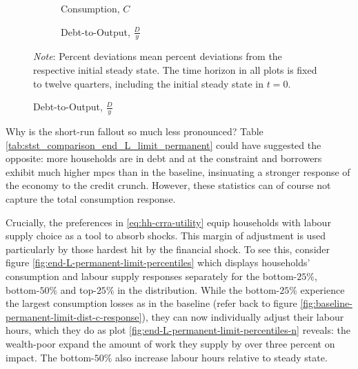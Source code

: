 \documentclass[a4paper,12pt]{article} %
\numberwithin{equation}{section} %
\numberwithin{figure}{section}
\numberwithin{table}{section}
\begin{document}
\begin{figure}[t]
    \centering
    \caption{Endogenous Labour Supply -- Shock to the Borrowing Limit: Aggregate Dynamics}
    \label{fig:comparison-end-labour-agg}
    \begin{subfigure}[b]{0.49\textwidth}
    \caption{Consumption, $C$}
    \label{fig:comparison-end-labour-c}
         \centering
         
     \end{subfigure}
     \hfill
    \begin{subfigure}[b]{0.49\textwidth}
    \caption{Debt-to-Output, $\frac{D}{y}$}
    \label{fig:comparison-end-labour-DY}
         \centering
         
     \end{subfigure}
     
     \vspace{10pt}
     
     \justifying
     \footnotesize
	\textit{Note}: Percent deviations mean percent deviations from the respective initial steady state. The time horizon in all plots is fixed to twelve quarters, including the initial steady state in $t=0$.
\end{figure}

Why is the short-run fallout so much less pronounced? Table \ref{tab:stst_comparison_end_L_limit_permanent} could have suggested the opposite: more households are in debt and at the constraint and borrowers exhibit much higher \Gls{mpc}s than in the baseline, insinuating a stronger response of the economy to the credit crunch. However, these statistics can of course not capture the total consumption response. 

Crucially, the preferences in \eqref{eq:hh-crra-utility} equip households with labour supply choice as a tool to absorb shocks. This margin of adjustment is used particularly by those hardest hit by the financial shock. To see this, consider figure \ref{fig:end-L-permanent-limit-percentiles} which displays households' consumption and labour supply responses separately for the bottom-$25\%$, bottom-$50\%$ and top-$25\%$ in the distribution. While the bottom-$25\%$ experience the largest consumption losses as in the baseline (refer back to figure \ref{fig:baseline-permanent-limit-dist-c-response}), they can now individually adjust their labour hours, which they do as plot \ref{fig:end-L-permanent-limit-percentiles-n} reveals: the wealth-poor expand the amount of work they supply by over three percent on impact. The bottom-$50\%$ also increase labour hours relative to steady state.
\end{document}
